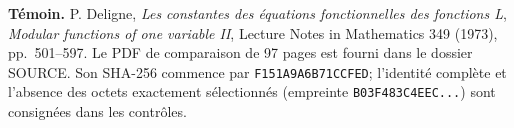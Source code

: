 \documentclass[10pt,letterpaper]{article}
\begin{document}
\par\medskip
\noindent\textbf{Témoin.} P. Deligne, \emph{Les constantes des équations fonctionnelles des fonctions L},
\emph{Modular functions of one variable II}, Lecture Notes in Mathematics 349 (1973), pp.~501--597.
Le PDF de comparaison de 97 pages est fourni dans le dossier SOURCE.
Son SHA-256 commence par \texttt{F151A9A6B71CCFED}; l'identité complète et l'absence des octets
exactement sélectionnés (empreinte \texttt{B03F483C4EEC...}) sont consignées dans les contrôles.

\endgroup
\end{document}
